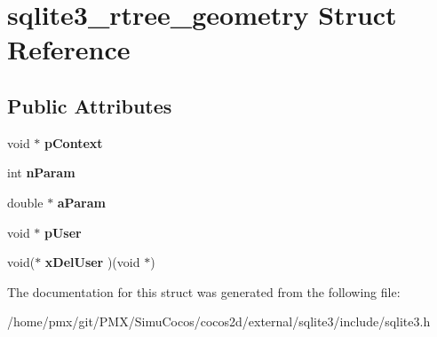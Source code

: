 \hypertarget{structsqlite3__rtree__geometry}{}\section{sqlite3\+\_\+rtree\+\_\+geometry Struct Reference}
\label{structsqlite3__rtree__geometry}
\subsection*{Public Attributes}
\begin{DoxyCompactItemize}
\item 
\mbox{\label{structsqlite3__rtree__geometry_a33f98691626846c1317419654d5c5f51}} 
void $\ast$ {\bfseries p\+Context}
\item 
\mbox{\label{structsqlite3__rtree__geometry_ada7b9eba82660e3321dd4c93526697c9}} 
int {\bfseries n\+Param}
\item 
\mbox{\label{structsqlite3__rtree__geometry_aa23f6565e6fee2416444333a75716057}} 
double $\ast$ {\bfseries a\+Param}
\item 
\mbox{\label{structsqlite3__rtree__geometry_a6fdedfd741cf5055f9562298cd32dc74}} 
void $\ast$ {\bfseries p\+User}
\item 
\mbox{\label{structsqlite3__rtree__geometry_afa1ed10f488b306df354efe56efdf287}} 
void($\ast$ {\bfseries x\+Del\+User} )(void $\ast$)
\end{DoxyCompactItemize}


The documentation for this struct was generated from the following file\+:\begin{DoxyCompactItemize}
\item 
/home/pmx/git/\+P\+M\+X/\+Simu\+Cocos/cocos2d/external/sqlite3/include/sqlite3.\+h\end{DoxyCompactItemize}
